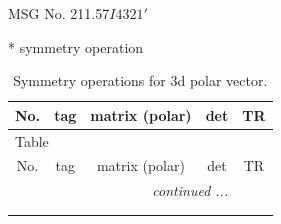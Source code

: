 \documentclass[fleqn,8pt]{jsarticle}
\begin{document}
\setcounter{MaxMatrixCols}{32}

\renewcommand{\tablename}{Table~}
\renewcommand{\figurename}{Figure~}
\begin{center}
\LARGE
MSG No. 211.57\quad$I4321'$
\end{center}
* symmetry operation
\renewcommand{\arraystretch}{1.3}
\begin{longtable}{ccccc}
\caption{Symmetry operations for 3d polar vector.}
 \\
 \hline \hline
No. & tag & matrix (polar) & det & TR \\ \hline \endfirsthead

\multicolumn{4}{l}{\tablename\ \thetable{}} \\
 \hline \hline
No. & tag & matrix (polar) & det & TR \\ \hline \endhead

 \hline \hline
\multicolumn{4}{r}{\footnotesize\it continued ...} \\ \endfoot

 \hline \hline
\multicolumn{4}{r}{} \\ \endlastfoot


\end{longtable}
\end{document}
